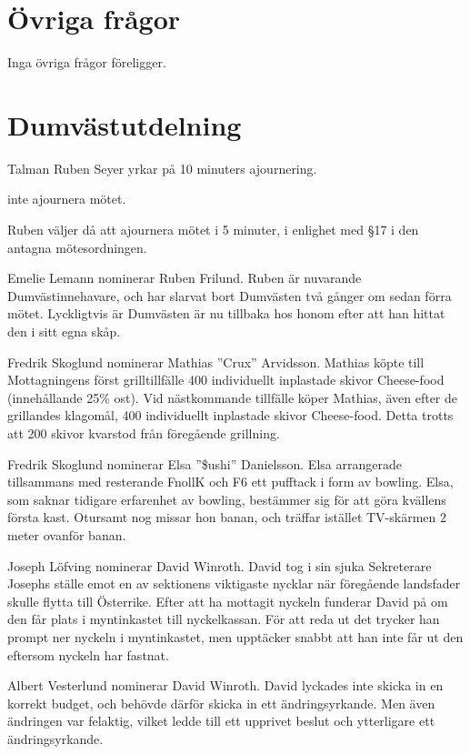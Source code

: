 \documentclass[hidelinks]{../sektionsmote} %
\begin{document}
\section{Övriga frågor}
Inga övriga frågor föreligger.

\section{Dumvästutdelning}
\begin{ofraga}
    Talman Ruben Seyer yrkar på 10 minuters ajournering.
    \begin{beslut}
        \item inte ajournera mötet.
    \end{beslut}
    Ruben väljer då att ajournera mötet i 5 minuter, i enlighet med §17 i den antagna mötesordningen.
\end{ofraga}

Emelie Lemann nominerar Ruben Frilund.
Ruben är nuvarande Dumvästinnehavare, och har slarvat bort Dumvästen två gånger om sedan förra mötet.
Lyckligtvis är Dumvästen är nu tillbaka hos honom efter att han hittat den i sitt egna skåp.

Fredrik Skoglund nominerar Mathias ''Crux'' Arvidsson.
Mathias köpte till Mottagningens först grilltillfälle 400 individuellt inplastade skivor Cheese-food (innehållande 25\% ost).
Vid nästkommande tillfälle köper Mathias, även efter de grillandes klagomål, 400 individuellt inplastade skivor Cheese-food.
Detta trotts att 200 skivor kvarstod från föregående grillning.

Fredrik Skoglund nominerar Elsa ''\$ushi'' Danielsson.
Elsa arrangerade tillsammans med resterande FnollK och F6 ett pufftack i form av bowling.
Elsa, som saknar tidigare erfarenhet av bowling, bestämmer sig för att göra kvällens första kast.
Otursamt nog missar hon banan, och träffar istället TV-skärmen 2 meter ovanför banan.

Joseph Löfving nominerar David Winroth.
David tog i sin sjuka Sekreterare Josephs ställe emot en av sektionens viktigaste nycklar när föregående landsfader skulle flytta till Österrike.
Efter att ha mottagit nyckeln funderar David på om den får plats i myntinkastet till nyckelkassan.
För att reda ut det trycker han prompt ner nyckeln i myntinkastet, men upptäcker snabbt att han inte får ut den eftersom nyckeln har fastnat.

Albert Vesterlund nominerar David Winroth.
David lyckades inte skicka in en korrekt budget, och behövde därför skicka in ett ändringsyrkande.
Men även ändringen var felaktig, vilket ledde till ett upprivet beslut och ytterligare ett ändringsyrkande.
\end{document}
